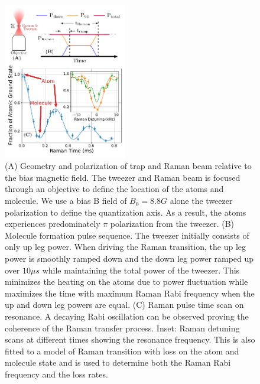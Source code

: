 \documentclass[aps,prl,twocolumn,superscriptaddress]{revtex4-1}
\begin{document}
\begin{figure}[ht!]
  \includegraphics[width=0.48\textwidth]{fig2.pdf}
  \caption{
    (A) Geometry and polarization of trap and Raman beam relative to the bias magnetic field.
    The tweezer and Raman beam is focused through an objective to define the location of the
    atoms and molecule.
    We use a bias B field of $B_0=8.8 G$ alone the tweezer polarization
    to define the quantization axis.
    As a result, the atoms experiences predominately $\pi$ polarization from the tweezer.
    (B) Molecule formation pulse sequence. The tweezer initially consists of only up leg power.
    When driving the Raman transition, the up leg power is smoothly ramped down and
    the down leg power ramped up over $10\mu s$ while maintaining the total power of the tweezer.
    This minimizes the heating on the atoms due to power fluctuation while maximizes the time
    with maximum Raman Rabi frequency when the up and down leg powers are equal.
    (C) Raman pulse time scan on resonance.
    A decaying Rabi oscillation can be observed proving the coherence of
    the Raman transfer process.
    Inset: Raman detuning scans at different times showing the resonance frequency.
    This is also fitted to a model of Raman transition
    with loss on the atom and molecule state and is used to determine
    both the Raman Rabi frequency and the loss rates.
    \label{f-raman}}
\end{figure}
\end{document}

